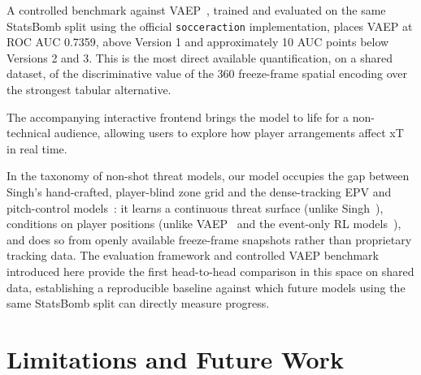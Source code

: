 A controlled benchmark against VAEP~\cite{decroos2019}, trained and evaluated on the same StatsBomb split using the official \texttt{socceraction} implementation, places VAEP at ROC AUC 0.7359, above Version 1 and approximately 10 AUC points below Versions 2 and 3. This is the most direct available quantification, on a shared dataset, of the discriminative value of the 360 freeze-frame spatial encoding over the strongest tabular alternative.

The accompanying interactive frontend brings the model to life for a non-technical audience, allowing users to explore how player arrangements affect xT in real time.

In the taxonomy of non-shot threat models, our model occupies the gap between Singh's hand-crafted, player-blind zone grid and the dense-tracking EPV and pitch-control models~\cite{spearman2018,fernandez2019epv}: it learns a continuous threat surface (unlike Singh~\cite{singh2019}), conditions on player positions (unlike VAEP~\cite{decroos2019} and the event-only RL models~\cite{liu2020deep}), and does so from openly available freeze-frame snapshots rather than proprietary tracking data. The evaluation framework and controlled VAEP benchmark introduced here provide the first head-to-head comparison in this space on shared data, establishing a reproducible baseline against which future models using the same StatsBomb split can directly measure progress.

\section{Limitations and Future Work}

